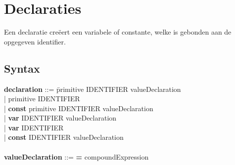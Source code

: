 \section{Declaraties}
Een declaratie cre\"{e}ert een variabele of constante, welke is gebonden aan de opgegeven identifier.
    \subsection{Syntax}    
        \begin{tabbing}
            {\bf declaration}         ::= \=primitive IDENTIFIER valueDeclaration\\
                                      \>| primitive IDENTIFIER\\
                                      \>| \textbf{const} primitive IDENTIFIER valueDeclaration\\
                                      \>| \textbf{var} IDENTIFIER valueDeclaration\\
                                      \>| \textbf{var} IDENTIFIER\\
                                      \>| \textbf{const} IDENTIFIER valueDeclaration\\
            \\
            {\bf valueDeclaration}    ::= \textbf{=} compoundExpression\\
        \end{tabbing}
